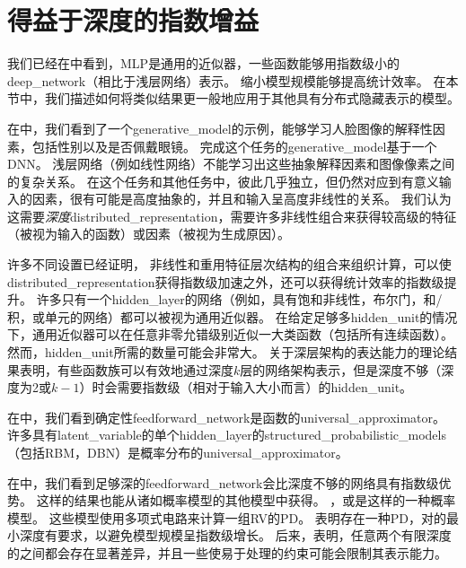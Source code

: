 \section{得益于深度的指数增益}
\label{sec:exponential_gains_from_depth}
我们已经在中看到，\gls{MLP}是通用的近似器，一些函数能够用指数级小的\gls{deep_network}（相比于浅层网络）表示。
缩小模型规模能够提高统计效率。
在本节中，我们描述如何将类似结果更一般地应用于其他具有分布式隐藏表示的模型。


在中，我们看到了一个\gls{generative_model}的示例，能够学习人脸图像的解释性因素，包括性别以及是否佩戴眼镜。
完成这个任务的\gls{generative_model}基于一个\gls{DNN}。
浅层网络（例如线性网络）不能学习出这些抽象解释因素和图像像素之间的复杂关系。
在这个任务和其他任务中，彼此几乎独立，但仍然对应到有意义输入的因素，很有可能是高度抽象的，并且和输入呈高度非线性的关系。
我们认为这需要\emph{深度}\gls{distributed_representation}，需要许多非线性组合来获得较高级的特征（被视为输入的函数）或因素（被视为生成原因）。


许多不同设置已经证明，
非线性和重用特征层次结构的组合来组织计算，可以使\gls{distributed_representation}获得指数级加速之外，还可以获得统计效率的指数级提升。
许多只有一个\gls{hidden_layer}的网络（例如，具有饱和非线性，布尔门，和/积，或单元的网络）都可以被视为通用近似器。
在给定足够多\gls{hidden_unit}的情况下，通用近似器可以在任意非零允错级别近似一大类函数（包括所有连续函数）。
然而，\gls{hidden_unit}所需的数量可能会非常大。
关于深层架构的表达能力的理论结果表明，有些函数族可以有效地通过深度$k$层的网络架构表示，但是深度不够（深度为2或$k-1$）时会需要指数级（相对于输入大小而言）的\gls{hidden_unit}。


在中，我们看到确定性\gls{feedforward_network}是函数的\gls{universal_approximator}。
许多具有\gls{latent_variable}的单个\gls{hidden_layer}的\gls{structured_probabilistic_models}（包括\gls{RBM}，\gls{DBN}）是概率分布的\gls{universal_approximator}\citep{LeRoux-Bengio-2007-TR,Montufar-2011,Montufar-et-al-NIPS2014,Krause-et-al-ICML2013}。


在中，我们看到足够深的\gls{feedforward_network}会比深度不够的网络具有指数级优势。
这样的结果也能从诸如概率模型的其他模型中获得。
，或\citep{Poon+Domingos-2011}是这样的一种概率模型。
这些模型使用多项式电路来计算一组\gls{RV}的\gls{PD}。
\cite{Delalleau+Bengio-2011-small}表明存在一种\gls{PD}，对的最小深度有要求，以避免模型规模呈指数级增长。
后来，\cite{Martens+Medabalimi-arxiv2014}表明，任意两个有限深度的之间都会存在显著差异，并且一些使易于处理的约束可能会限制其表示能力。


